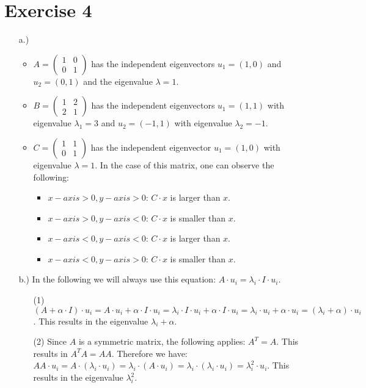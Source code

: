 \documentclass[%
   10pt,              %
   a4paper,           %
   DIV10,             %
]{scrartcl}%
\begin{document}
\section*{Exercise 4}
\begin{itemize}
	\item[a.)] \begin{itemize}
		\item $A = \begin{pmatrix}
		1 & 0\\
		0 & 1
		\end{pmatrix}$ has the independent eigenvectors $u_1 = (1, 0)$ and $u_2 = (0,1)$ and the eigenvalue $\lambda = 1$.
		\item $B = \begin{pmatrix}
		1 & 2\\
		2 & 1
		\end{pmatrix}$ has the independent eigenvectors $u_1 = (1, 1)$ with eigenvalue $\lambda_1 = 3$ and $u_2 = (-1, 1)$ with eigenvalue $\lambda_2 = -1$.
		\item $C = \begin{pmatrix}
		1 & 1\\
		0 & 1
		\end{pmatrix}$ has the independent eigenvector $u_1 = (1, 0)$ with eigenvalue $\lambda = 1$. In the case of this matrix, one can observe the following:\begin{itemize}
			\item $x-axis > 0, y-axis > 0$: $C \cdot x$ is larger than $x$. 
			\item $x-axis > 0, y-axis < 0$: $C \cdot x$ is smaller than $x$. 
			\item $x-axis < 0, y-axis < 0$: $C \cdot x$ is larger than $x$. 
			\item $x-axis < 0, y-axis > 0$: $C \cdot x$ is smaller than $x$. 
		\end{itemize}
	\end{itemize}
	\item[b.)] In the following we will always use this equation: $A \cdot u_i = \lambda_i \cdot I \cdot u_i$. \begin{enumerate} 
		\item[(1)] $(A + \alpha \cdot I) \cdot u_i = A\cdot u_i + \alpha \cdot I \cdot u_i = \lambda_i \cdot I \cdot u_i + \alpha \cdot I \cdot u_i = \lambda_i \cdot u_i + \alpha \cdot u_i = (\lambda_i + \alpha) \cdot u_i$. This results in the eigenvalue $\lambda_i + \alpha$.
		\item [(2)] Since $A$ is a symmetric matrix, the following applies: $A^T = A$. This results in $A^T A = AA$. Therefore we have: $AA \cdot u_i = A \cdot (\lambda_i \cdot u_i) = \lambda_i \cdot (A \cdot u_i) = \lambda_i \cdot (\lambda_i \cdot u_i) = \lambda_i^2 \cdot u_i$. This results in the eigenvalue $\lambda_i^2$.

\end{enumerate}
\end{itemize}
\end{document}
